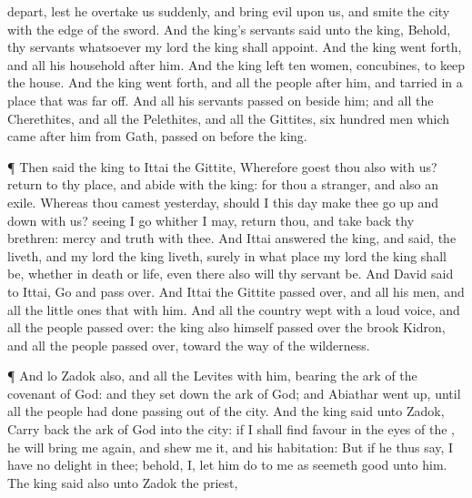{depart, lest he
overtake us
suddenly, and
bring
evil upon us, and
smite the
city with the
edge of the
sword.
And the
king’s
servants
said unto the
king, Behold, thy
servants
{} whatsoever my
lord the
king shall
appoint.
And the
king went
forth, and all his
household
after him. And the
king
left
ten
women,
{}
concubines, to
keep the
house.
And the
king went
forth, and all the
people
after him, and
tarried in a
place that was far
off.
And all his
servants passed
on
beside him; and all the
Cherethites, and all the
Pelethites, and all the
Gittites,
six
hundred
men which
came
after him from
Gath, passed
on
before the
king.
\par }{\PP {}¶ Then
said the
king to
Ittai the
Gittite, Wherefore
goest thou also with us?
return to thy
place, and
abide with the
king: for thou
{} a
stranger, and also an
exile.
Whereas thou
camest
{}
yesterday, should I this
day make thee
go up and
down with us? seeing I
go whither I may,
return thou, and take
back thy
brethren:
mercy and
truth
{} with thee.
And
Ittai
answered the
king, and
said,
{} the
{}
liveth, and
{} my
lord the
king
liveth, surely in what
place my
lord the
king shall be, whether in
death or
life, even there also will thy
servant be.
And
David
said to
Ittai,
Go and pass
over. And
Ittai the
Gittite passed
over, and all his
men, and all the little
ones that
{} with him.
And all the
country
wept with a
loud
voice, and all the
people passed
over: the
king also himself passed
over the
brook
Kidron, and all the
people passed
over,
toward the
way of the
wilderness.
\par }{\PP {}¶ And lo
Zadok also, and all the
Levites
{} with him,
bearing the
ark of the
covenant of
God: and they set
down the
ark of
God; and
Abiathar went
up, until all the
people had
done
passing out of the
city.
And the
king
said unto
Zadok, Carry
back the
ark of
God into the
city: if I shall
find
favour in the
eyes of the
{}, he will bring me
again, and
shew me
{} it, and his
habitation:
But if he thus
say, I have no
delight in thee; behold,
{} I, let him
do to me as
seemeth
good unto him.
The
king
said also unto
Zadok the
priest,
}

